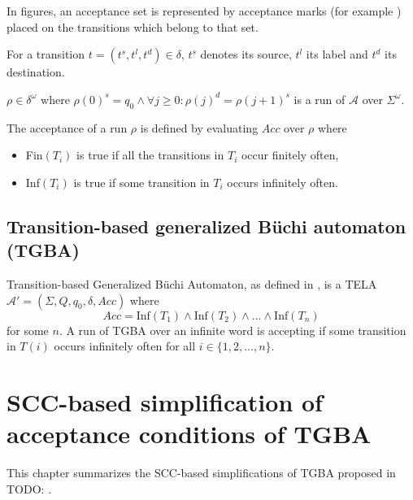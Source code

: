 \documentclass[
  digital, %
  twoside, %
  table,   %
  lof,     %
  lot,     %
]{fithesis3}
\begin{document}
In figures, an acceptance set is represented by acceptance marks (for example \accmarkblue) placed on the transitions which belong to that set.

For a transition $t = (t^s, t^l, t^d) \in \delta$, $t^s$ denotes its source, $t^l$ its label and $t^d$ its destination.

$\rho \in \delta^\omega$ where $\rho(0)^s = q_0 \wedge \forall j \geq 0 \colon \rho(j)^d = \rho(j + 1)^s$ is a run of $\mathcal{A}$ over $\Sigma^\omega$.

The acceptance of a run $\rho$ is defined by evaluating $Acc$ over $\rho$ where
\begin{itemize}
  \item Fin$(T_i)$ is true if all the transitions in $T_i$ occur finitely often, 
  \item Inf$(T_i)$ is true if some transition in $T_i$ occurs infinitely often.
\end{itemize}

\section{Transition-based generalized Büchi automaton (TGBA)}
\label{sec:tgba}
Transition-based Generalized Büchi Automaton, as defined in \cite{bloemen2017}, is a TELA $\mathcal{A'} = (\Sigma, Q, q_0, \delta, Acc)$ where 
\begin{equation*}
  Acc = \text{Inf}(T_1) \wedge \text{Inf}(T_2) \wedge \dots \wedge \text{Inf}(T_n)
\end{equation*} 
for some $n$. A run of TGBA over an infinite word is accepting if some transition in $T(i)$ occurs infinitely often for all $i \in \{1, 2, \dots, n\}$. 

\chapter{SCC-based simplification of acceptance conditions of TGBA} 
\label{chap:tgba_simpl}
This chapter summarizes the SCC-based simplifications of TGBA proposed in TODO: \cite{spin2013}.
\end{document}
